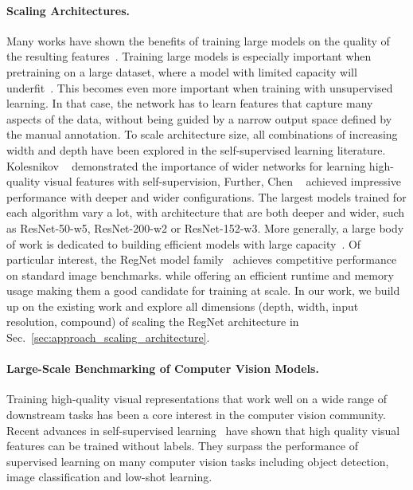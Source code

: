 \documentclass[10pt,twocolumn,letterpaper]{article}
\newcommand{\regnet}{RegNet\xspace}
\begin{document}
\paragraph{Scaling Architectures.}
Many works have shown the benefits of training large models on the quality of the resulting features~\cite{radosavovic2020designing,tan2019efficientnet,xie2017aggregated}. 
Training large models is especially important when pretraining on a large dataset, where a model with limited capacity will underfit~\cite{mahajan2018exploring}.  
This becomes even more important when training with unsupervised learning.
In that case, the network has to learn features that capture many aspects of the data, without being guided by a narrow output space defined by the manual annotation. 
To scale architecture size, all combinations of increasing width and depth have been explored in the self-supervised learning literature.
Kolesnikov \etal~\cite{kolesnikov2019revisiting} demonstrated the importance of wider networks for learning  high-quality visual features with self-supervision, 
Further, Chen \etal~\cite{chen2020big} achieved impressive performance with deeper and wider configurations. 
The largest models trained for each algorithm vary a lot, with architecture that are both deeper and wider, such as ResNet-50-w5, ResNet-200-w2 or ResNet-152-w3.
More generally, a large body of work is dedicated to building efficient models with large capacity~\cite{bello2021revisiting,tan2019efficientnet,touvron2020fixing,xie2017aggregated}.
Of particular interest, the RegNet model family~\cite{radosavovic2020designing} achieves competitive performance on standard image benchmarks.
while offering an efficient runtime and memory usage making them a good candidate for training at scale. 
In our work, we build up on the existing work and explore all  dimensions (depth, width, input resolution, compound) of scaling the \regnet architecture in Sec.~\ref{sec:approach_scaling_architecture}.



\paragraph{Large-Scale Benchmarking of Computer Vision Models.}
Training high-quality visual representations that work well on a wide range of downstream tasks has been a core interest in the computer vision community. 
Recent advances in self-supervised learning~\cite{caron2020unsupervised,chen2020simple,he2020momentum,goyal2019scaling,goyal2021self} have shown that high quality visual features can be trained without labels.
They surpass the performance of supervised learning on many computer vision tasks including object detection, image classification and low-shot learning. 
\end{document}
